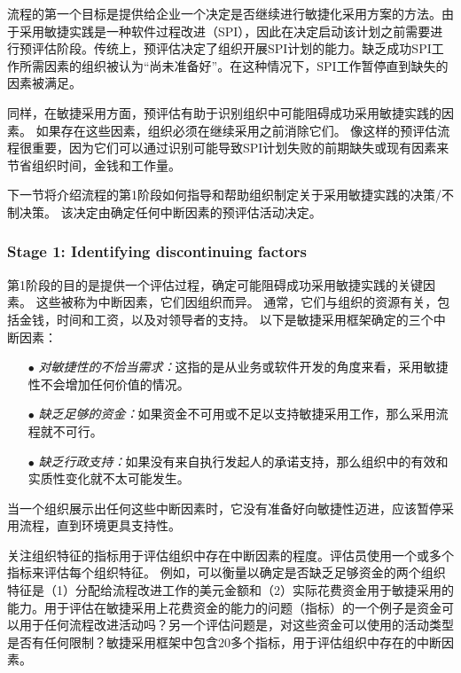 \documentclass[twocolumn]{svjour3}[]
\begin{document}
流程的第一个目标是提供给企业一个决定是否继续进行敏捷化采用方案的方法。由于采用敏捷实践是一种软件过程改进（SPI），因此在决定启动该计划之前需要进行预评估阶段。传统上，预评估决定了组织开展SPI计划的能力\cite{grady1997successful}。缺乏成功SPI工作所需因素的组织被认为“尚未准备好”。在这种情况下，SPI工作暂停直到缺失的因素被满足。

同样，在敏捷采用方面，预评估有助于识别组织中可能阻碍成功采用敏捷实践的因素。 如果存在这些因素，组织必须在继续采用之前消除它们。 像这样的预评估流程很重要，因为它们可以通过识别可能导致SPI计划失败的前期缺失或现有因素来节省组织时间，金钱和工作量\cite{jan2005aim}。

下一节将介绍流程的第1阶段如何指导和帮助组织制定关于采用敏捷实践的决策/不制决策。 该决定由确定任何中断因素的预评估活动决定。

\subsubsection{Stage 1: Identifying discontinuing factors}

第1阶段的目的是提供一个评估过程，确定可能阻碍成功采用敏捷实践的关键因素。 这些被称为中断因素，它们因组织而异。 通常，它们与组织的资源有关，包括金钱，时间和工资，以及对领导者的支持。 以下是敏捷采用框架确定的三个中断因素：

\begin{itemize}
    \item[$\bullet$] \textit{对敏捷性的不恰当需求：}这指的是从业务或软件开发的角度来看，采用敏捷性不会增加任何价值的情况\cite{spayd2003evolving}。
    \item[$\bullet$] \textit{缺乏足够的资金：}如果资金不可用或不足以支持敏捷采用工作，那么采用流程就不可行。
    \item[$\bullet$] \textit{缺乏行政支持：}如果没有来自执行发起人的承诺支持，那么组织中的有效和实质性变化就不太可能发生\cite{pukinskis5stumbling,spayd2003evolving}。
\end{itemize}

当一个组织展示出任何这些中断因素时，它没有准备好向敏捷性迈进，应该暂停采用流程，直到环境更具支持性。

关注组织特征的指标用于评估组织中存在中断因素的程度。评估员使用一个或多个指标来评估每个组织特征。 例如，可以衡量以确定是否缺乏足够资金的两个组织特征是（1）分配给流程改进工作的美元金额和（2）实际花费资金用于敏捷采用的能力。用于评估在敏捷采用上花费资金的能力的问题（指标）的一个例子是资金可以用于任何流程改进活动吗？另一个评估问题是，对这些资金可以使用的活动类型是否有任何限制？敏捷采用框架中包含20多个指标，用于评估组织中存在的中断因素\cite{sidky2006agile}。
\end{document}
